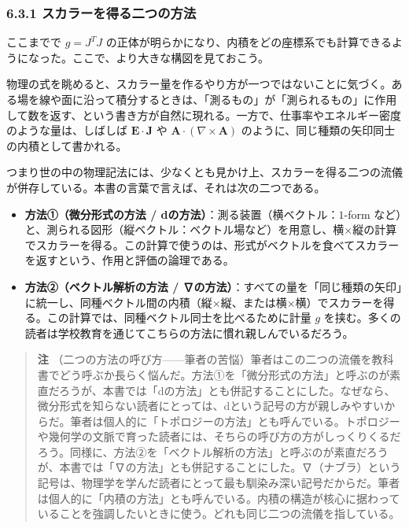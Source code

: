 \documentclass[a4paper,12pt,openany]{book}
\begin{document}
\hypertarget{ux30b9ux30abux30e9ux30fcux3092ux5f97ux308bux4e8cux3064ux306eux65b9ux6cd5}{%
\subsubsection{6.3.1
スカラーを得る二つの方法}\label{ux30b9ux30abux30e9ux30fcux3092ux5f97ux308bux4e8cux3064ux306eux65b9ux6cd5}}

ここまでで \(g = J^T J\)
の正体が明らかになり、内積をどの座標系でも計算できるようになった。ここで、より大きな構図を見ておこう。

物理の式を眺めると、スカラー量を作るやり方が一つではないことに気づく。ある場を線や面に沿って積分するときは、「測るもの」が「測られるもの」に作用して数を返す、という書き方が自然に現れる。一方で、仕事率やエネルギー密度のような量は、しばしば
\(\mathbf{E}\cdot\mathbf{J}\) や
\(\mathbf{A}\cdot(\nabla\times\mathbf{A})\)
のように、同じ種類の矢印同士の内積として書かれる。

つまり世の中の物理記法には、少なくとも見かけ上、スカラーを得る二つの流儀が併存している。本書の言葉で言えば、それは次の二つである。

\begin{itemize}
\item
  \textbf{方法①（微分形式の方法 / dの方法）}：測る装置（横ベクトル：\(1\)-form
  など）と、測られる図形（縦ベクトル：ベクトル場など）を用意し、横×縦の計算でスカラーを得る。この計算で使うのは、形式がベクトルを食べてスカラーを返すという、作用と評価の論理である。
\item
  \textbf{方法②（ベクトル解析の方法 / ∇の方法）}：すべての量を「同じ種類の矢印」に統一し、同種ベクトル間の内積（縦×縦、または横×横）でスカラーを得る。この計算では、同種ベクトル同士を比べるために計量
  \(g\)
  を挟む。多くの読者は学校教育を通じてこちらの方法に慣れ親しんでいるだろう。
\end{itemize}

\begin{quote}
\textbf{注}
（二つの方法の呼び方——筆者の苦悩）筆者はこの二つの流儀を教科書でどう呼ぶか長らく悩んだ。方法①を「微分形式の方法」と呼ぶのが素直だろうが、本書では「dの方法」とも併記することにした。なぜなら、微分形式を知らない読者にとっては、dという記号の方が親しみやすいからだ。筆者は個人的に「トポロジーの方法」とも呼んでいる。トポロジーや幾何学の文脈で育った読者には、そちらの呼び方の方がしっくりくるだろう。同様に、方法②を「ベクトル解析の方法」と呼ぶのが素直だろうが、本書では「∇の方法」とも併記することにした。∇（ナブラ）という記号は、物理学を学んだ読者にとって最も馴染み深い記号だからだ。筆者は個人的に「内積の方法」とも呼んでいる。内積の構造が核心に据わっていることを強調したいときに使う。どれも同じ二つの流儀を指している。
\end{quote}
\end{document}
